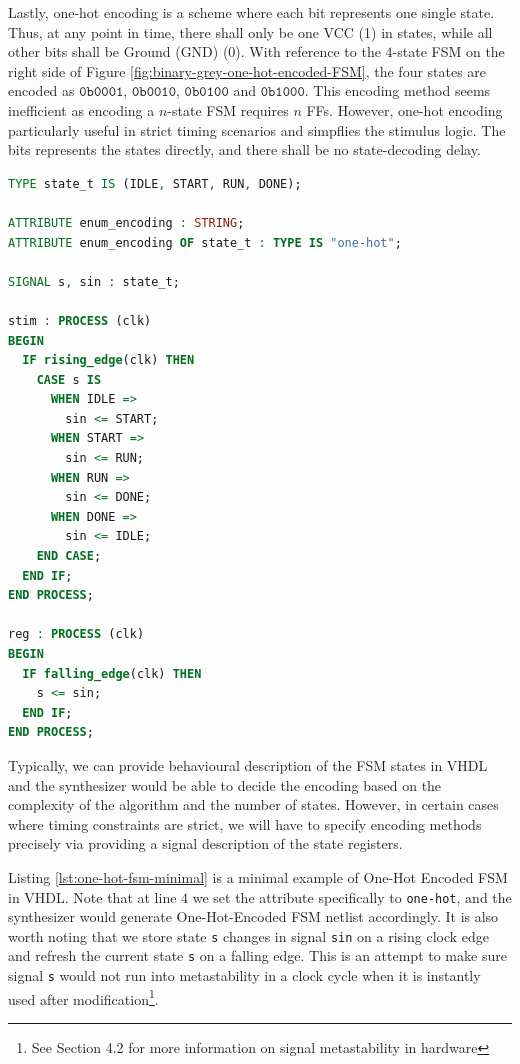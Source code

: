 \documentclass[a4paper]{report}
\newcommand{\proglang}{\textsf}
\newcommand{\code}{\texttt}
\begin{document}
Lastly, one-hot encoding is a scheme where each bit represents one single state. Thus, at any point in time, there shall only be one VCC (1) in states, while all other bits shall be Ground (GND) (0). With reference to the $4$-state FSM on the right side of Figure \ref{fig:binary-grey-one-hot-encoded-FSM}, the four states are encoded as $\mathtt{0b0001}$, $\mathtt{0b0010}$,  $\mathtt{0b0100}$ and $\mathtt{0b1000}$. This encoding method seems inefficient as encoding a $n$-state FSM requires $n$ FFs. However, one-hot encoding particularly useful in strict timing scenarios and simpflies the stimulus logic. The bits represents the states directly, and there shall be no state-decoding delay.

\begin{lstlisting}[language=VHDL, caption=One-Hot Encoded FSM Minimal Example in \proglang{VHDL}, label={lst:one-hot-fsm-minimal}]
TYPE state_t IS (IDLE, START, RUN, DONE);

ATTRIBUTE enum_encoding : STRING;
ATTRIBUTE enum_encoding OF state_t : TYPE IS "one-hot";

SIGNAL s, sin : state_t;

stim : PROCESS (clk)
BEGIN
  IF rising_edge(clk) THEN
    CASE s IS
      WHEN IDLE =>
        sin <= START;
      WHEN START =>
        sin <= RUN;
      WHEN RUN =>
        sin <= DONE;
      WHEN DONE =>
        sin <= IDLE;
    END CASE;
  END IF;
END PROCESS;

reg : PROCESS (clk)
BEGIN
  IF falling_edge(clk) THEN
    s <= sin;
  END IF;
END PROCESS;
\end{lstlisting}

Typically, we can provide behavioural description of the FSM states in \proglang{VHDL} and the synthesizer would be able to decide the encoding based on the complexity of the algorithm and the number of states. However, in certain cases where timing constraints are strict, we will have to specify encoding methods precisely via providing a signal description of the state registers.

Listing \ref{lst:one-hot-fsm-minimal} is a minimal example of One-Hot Encoded FSM in \proglang{VHDL}. Note that at line $4$ we set the attribute specifically to \code{one-hot}, and the synthesizer would generate One-Hot-Encoded FSM netlist accordingly. It is also worth noting that we store state \code{s} changes in signal \code{sin} on a rising clock edge and refresh the current state \code{s} on a falling edge. This is an attempt to make sure signal \code{s} would not run into metastability in a clock cycle when it is instantly used after modification\footnote{See Section 4.2 for more information on signal metastability in hardware}.
\end{document}
